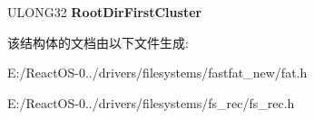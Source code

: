 \begin{DoxyCompactItemize}
\begin{tabbing}
\end{tabbing}\item 
\mbox{\label{struct_b_i_o_s___p_a_r_a_m_e_t_e_r___b_l_o_c_k_ac3893ac0d54b9288738604e83bc44b1c}} 
U\+L\+O\+N\+G32 {\bfseries Root\+Dir\+First\+Cluster}
\end{DoxyCompactItemize}


该结构体的文档由以下文件生成\+:\begin{DoxyCompactItemize}
\item 
E\+:/\+React\+O\+S-\/0../drivers/filesystems/fastfat\+\_\+new/fat.\+h\item 
E\+:/\+React\+O\+S-\/0../drivers/filesystems/fs\+\_\+rec/fs\+\_\+rec.\+h\end{DoxyCompactItemize}
